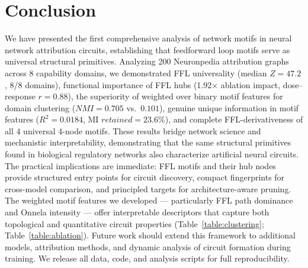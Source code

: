 \section{Conclusion}\label{sec:conclusion}

We have presented the first comprehensive analysis of network motifs in neural network attribution circuits, establishing that feedforward loop motifs serve as universal structural primitives. Analyzing 200 Neuronpedia attribution graphs across 8 capability domains, we demonstrated FFL universality (median $Z=47.2$, 8/8 domains), functional importance of FFL hubs (1.92$\times$ ablation impact, dose--response $r=0.88$), the superiority of weighted over binary motif features for domain clustering ($NMI=0.705$ vs.\ $0.101$), genuine unique information in motif features ($R^2=0.0184$, MI $retained=23.6\%$), and complete FFL-derivativeness of all 4 universal 4-node motifs. These results bridge network science and mechanistic interpretability, demonstrating that the same structural primitives found in biological regulatory networks \cite{alon2007network, milo2002network} also characterize artificial neural circuits. The practical implications are immediate: FFL motifs and their hub nodes provide structured entry points for circuit discovery, compact fingerprints for cross-model comparison, and principled targets for architecture-aware pruning. The weighted motif features we developed --- particularly FFL path dominance and Onnela intensity --- offer interpretable descriptors that capture both topological and quantitative circuit properties (Table~\ref{table:clustering}; Table~\ref{table:ablation}). Future work should extend this framework to additional models, attribution methods, and dynamic analysis of circuit formation during training. We release all data, code, and analysis scripts for full reproducibility.